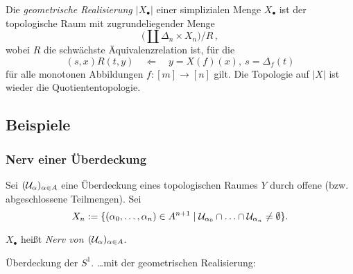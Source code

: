 \begin{definition}
  Die \emph{geometrische Realisierung $|X_\bullet|$} einer simplizialen Menge
  $X_\bullet$ ist der topologische Raum mit zugrundeliegender Menge
  \[ \big( \coprod \Delta_n \times X_n \big) \big/ R\,,\]
  wobei $R$ die schwächste Äquivalenzrelation ist, für die
  \[ (s,x) R (t,y) \quad\Longleftarrow\quad
    y = X(f)(x),\ s = \Delta_f(t)\]
  für alle monotonen Abbildungen $f:[m]\to [n]$ gilt. Die Topologie auf $|X|$ ist
  wieder die Quotiententopologie.
\end{definition}

\subsection{Beispiele}
\subsubsection{Nerv einer Überdeckung}

Sei $(\mathcal{U}_\alpha)_{\alpha \in A}$ eine Überdeckung eines topologischen Raumes
$Y$ durch offene (bzw. abgeschlossene Teilmengen). Sei
\[ X_n := \{ (\alpha_0, \ldots, \alpha_n) \in A^{n+1} \mid 
  \mathcal{U}_{\alpha_0} \cap \ldots \cap \mathcal{U}_{\alpha_n} \neq \emptyset \}.\]

\begin{definition}
  $X_\bullet$ heißt \emph{Nerv von $(\mathcal{U}_\alpha)_{\alpha\in A}$}.
\end{definition}

\begin{beispiel}
  \Bild Überdeckung der $S^1$.
  \ldots mit der geometrischen Realisierung:
  \begin{center}
  \end{center}
\end{beispiel}

